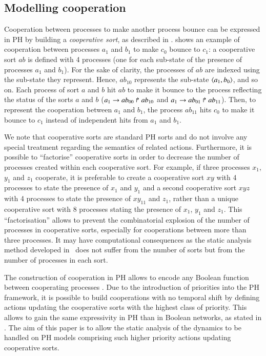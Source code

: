 \begin{example}
\end{example}



\subsection{Modelling cooperation}
\label{ssec:cooperation}

Cooperation between processes to make another process bounce can be expressed in PH by building a \emph{cooperative sort}, as described in \cite{PMR10-TCSB}.
 shows an example of cooperation between processes $a_1$ and $b_1$ to make $c_0$ bounce to $c_1$:
a cooperative sort $ab$ is defined with 4 processes (one for each sub-state of the presence of processes $a_1$ and $b_1$).
For the sake of clarity, the processes of $ab$ are indexed using the sub-state they represent.
Hence, $ab_{10}$ represents the sub-state $\mbox{$\langle a_1,b_0 \rangle$}$, and so on.
Each process of sort $a$ and $b$ hit $ab$ to make it bounce to the process reflecting the status of the sorts $a$ and $b$
(\eg $a_1\rightarrow ab_{00}\Rsh ab_{10}$ and $a_1\rightarrow ab_{01}\Rsh ab_{11}$).
Then, to represent the cooperation between $a_1$ and $b_1$, the process $ab_{11}$ hits $c_0$ to make it bounce to $c_1$ instead of independent hits from $a_1$ and $b_1$.

We note that cooperative sorts are standard PH sorts and do not involve any
special treatment regarding the semantics of related actions.
Furthermore, it is possible to “factorise” cooperative sorts in order to decrease the number of processes created within each cooperative sort.
For example, if three processes $x_1$, $y_1$ and $z_1$ cooperate,
it is preferable to create a cooperative sort $xy$ with 4 processes to state the presence of $x_1$ and $y_1$
and a second cooperative sort $xyz$ with 4 processes to state the presence of $xy_{11}$ and $z_1$,
rather than a unique cooperative sort with 8 processes stating the presence of $x_1$, $y_1$ and $z_1$.
This “factorisation” allows to prevent the combinatorial explosion of the number of processes in cooperative sorts,
especially for cooperations between more than three processes.
It may have computational consequences as the static analysis method developed in~ does not suffer from the number of sorts but from the number of processes in each sort.

The construction of cooperation in PH allows to encode any Boolean function between cooperating processes \cite{PMR10-TCSB}.
Due to the introduction of priorities into the PH framework,
it is possible to build cooperations with no temporal shift by defining actions updating the cooperative sorts with the highest class of priority.
This allows to gain the same expressivity in PH than in Boolean networks, as stated in .
The aim of this paper is to allow the static analysis of the dynamics to be handled on PH models comprising such higher priority actions updating cooperative sorts.



